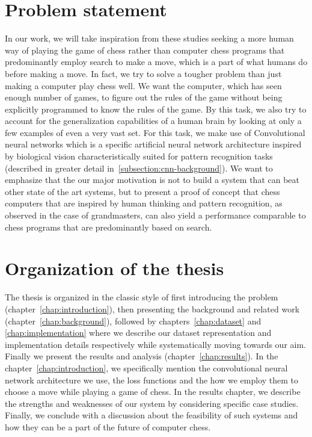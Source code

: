 \section{Problem statement}
In our work, we will take inspiration from these studies seeking a more human 
way of playing the game of chess rather than computer chess 
programs that predominantly employ search to make a move, which is a part of 
what humans do before making a move. In fact, we try to solve a tougher 
problem than just making a computer play chess well. We want the computer, 
which has seen enough number of games, to figure out the rules of the game 
without being explicitly programmed to know the rules of the game. By this 
task, we also try to account for the generalization capabilities of a human 
brain by looking at only a few examples of even a very vast set. For this task, 
we make use of Convolutional neural networks which is a specific artificial 
neural network architecture inspired by biological vision characteristically 
suited for pattern recognition tasks (described in greater detail 
in~\ref{subsection:cnn-background}). We want to emphasize that the our major 
motivation is not to build a system that can beat other state of the art 
systems, but to present a proof of concept that chess computers that are 
inspired by human thinking and pattern recognition, as observed in the 
case of grandmasters, can also yield a performance comparable to chess 
programs that are predominantly based on search.

\section*{Organization of the thesis}
The thesis is organized in the classic style of first introducing the problem 
(chapter~\ref{chap:introduction}), then presenting the background and related 
work (chapter~\ref{chap:background}), followed by chapters~\ref{chap:dataset} 
and \ref{chap:implementation} where we describe our dataset representation and 
implementation details respectively while systematically moving towards our 
aim. Finally we present the results and analysis (chapter~\ref{chap:results}). 
In the chapter~\ref{chap:introduction}, we specifically mention the 
convolutional neural network architecture we use, the loss functions and 
the how we employ them to choose a move while playing a game of chess. In the 
results chapter, we describe the strengths and weaknesses of our system by 
considering specific case studies. Finally, we conclude with a discussion about 
the feasibility of such systems and how they can be a part of the future of 
computer chess.